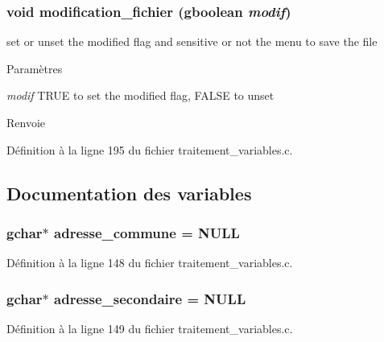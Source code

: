 \subsubsection[{modification\_\-fichier}]{\setlength{\rightskip}{0pt plus 5cm}void modification\_\-fichier (gboolean {\em modif})}\label{traitement__variables_8c_aa4084b9e508b1d1fea1d09c6b6208021}
set or unset the modified flag and sensitive or not the menu to save the file


\begin{DoxyParams}{Paramètres}
\item[{\em modif}]TRUE to set the modified flag, FALSE to unset\end{DoxyParams}
\begin{DoxyReturn}{Renvoie}

\end{DoxyReturn}


Définition à la ligne 195 du fichier traitement\_\-variables.c.



\subsection{Documentation des variables}
\subsubsection[{adresse\_\-commune}]{\setlength{\rightskip}{0pt plus 5cm}gchar$\ast$ {\bf adresse\_\-commune} = NULL}\label{traitement__variables_8c_ab7ec5b8a1b4dca10b71bfe0364eb7248}


Définition à la ligne 148 du fichier traitement\_\-variables.c.

\subsubsection[{adresse\_\-secondaire}]{\setlength{\rightskip}{0pt plus 5cm}gchar$\ast$ {\bf adresse\_\-secondaire} = NULL}\label{traitement__variables_8c_a5495a13fee46daf1634623fe4e63f99a}


Définition à la ligne 149 du fichier traitement\_\-variables.c.

